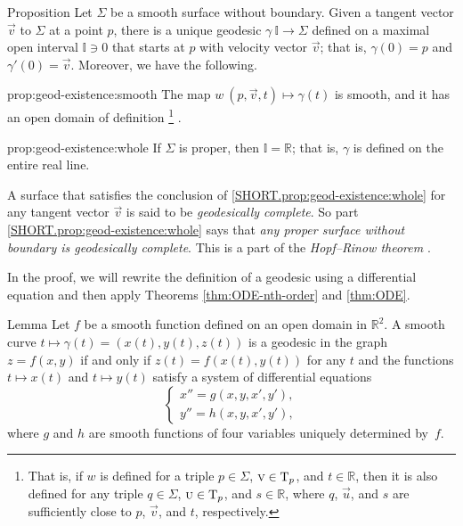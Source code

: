 \begin{thm}{Proposition}\label{prop:geod-existence} 
Let $\Sigma$ be a smooth surface without boundary.
Given a tangent vector ${\vec v}$ to $\Sigma$ at a point $p$,
there is a unique geodesic $\gamma\:\mathbb{I}\to \Sigma$ defined on a maximal open interval $\mathbb{I}\ni 0$ that starts at $p$ with velocity vector ${\vec v}$;
that is, $\gamma(0)=p$ and $\gamma'(0)={\vec v}$.
Moreover, we have the following.
\begin{subthm}{prop:geod-existence:smooth}
The map $w\:(p,{\vec v},t)\mapsto \gamma(t)$ is smooth, and it has an open domain of definition%
\footnote{That is, if $w$ is defined for a triple $p\in \Sigma$, ${\text{\sc{v}}}\in \mathrm{T}_p$, and $t\in \mathbb{R}$,
then it is also defined for any triple $q\in \Sigma$, $\text{\sc{u}}\in \mathrm{T}_p$, and $s\in \mathbb{R}$, where $q$, $\vec u$, and $s$ are sufficiently close to $p$, ${\vec v}$, and $t$, respectively.}%
.
\end{subthm}

\begin{subthm}{prop:geod-existence:whole}
If $\Sigma$ is proper, then $\mathbb{I}=\mathbb{R}$; that is, $\gamma$ is defined on the entire real line.
\end{subthm}

\end{thm}

A surface that satisfies the conclusion of \ref{SHORT.prop:geod-existence:whole} for any tangent vector ${\vec v}$ is said to be \emph{geodesically complete}.
So part \ref{SHORT.prop:geod-existence:whole} says that \textit{any proper surface without boundary is geodesically complete}.
This is a part of the \emph{Hopf--Rinow theorem} \cite{hopf-rinow}.

In the proof, we will rewrite the definition of a geodesic using a differential equation and then apply Theorems \ref{thm:ODE-nth-order} and \ref{thm:ODE}.

\begin{thm}{Lemma}\label{lem:geodesic=2nd-order}
Let $f$ be a smooth function defined on an open domain in $\mathbb{R}^2$.
A smooth curve $t\mapsto \gamma(t)=(x(t),y(t),z(t))$ is a geodesic in the graph $z=f(x,y)$ if and only if $z(t)=f(x(t),y(t))$ for any $t$ and the functions $t\mapsto x(t)$ and $t\mapsto y(t)$
satisfy a system of differential equations
\[
\begin{cases}
x''=g(x,y,x',y'),
\\
y''=h(x,y,x',y'),
\end{cases}
\]
where $g$ and $h$ are smooth functions of four variables uniquely determined by~$f$.
\end{thm}

